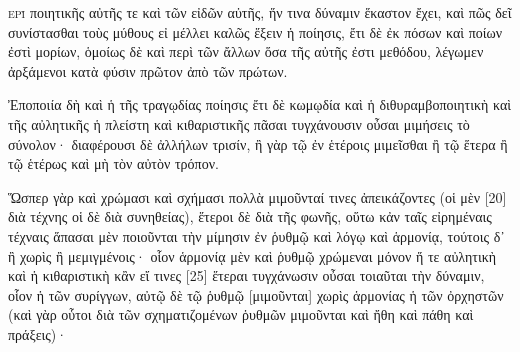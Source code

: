 \documentclass{book}
\begin{document}
{\newfontfamily{}
\plk
\newfontfamily{}
 \newsavebox{\mybox}
 \lettrine[lines=3]{\usebox{\mybox}}{ερὶ} ποιητικῆς αὐτῆς τε καὶ τῶν εἰδῶν αὐτῆς, ἥν τινα δύναμιν ἕκαστον ἔχει, 
καὶ πῶς δεῖ συνίστασθαι τοὺς μύθους  εἰ μέλλει καλῶς ἕξειν ἡ ποίησις, ἔτι δὲ ἐκ πόσων καὶ ποίων 
ἐστὶ μορίων, ὁμοίως δὲ καὶ περὶ τῶν ἄλλων ὅσα τῆς αὐτῆς ἐστι μεθόδου, λέγωμεν ἀρξάμενοι κατὰ φύσιν 
πρῶτον ἀπὸ τῶν πρώτων.
 
Ἐποποιία δὴ καὶ ἡ τῆς τραγῳδίας ποίησις ἔτι δὲ κωμῳδία καὶ ἡ διθυραμβοποιητικὴ καὶ τῆς αὐλητικῆς 
ἡ πλείστη καὶ κιθαριστικῆς πᾶσαι τυγχάνουσιν οὖσαι μιμήσεις τὸ σύνολον· διαφέρουσι δὲ ἀλλήλων τρισίν, 
ἢ γὰρ τῷ ἐν ἑτέροις μιμεῖσθαι ἢ τῷ ἕτερα ἢ τῷ ἑτέρως καὶ μὴ τὸν αὐτὸν τρόπον. 

Ὥσπερ γὰρ καὶ χρώμασι καὶ σχήμασι πολλὰ μιμοῦνταί τινες ἀπεικάζοντες (οἱ μὲν [20] διὰ τέχνης οἱ δὲ διὰ συνηθείας),
ἕτεροι δὲ διὰ τῆς φωνῆς, οὕτω κἀν ταῖς εἰρημέναις τέχναις ἅπασαι μὲν ποιοῦνται τὴν μίμησιν ἐν ῥυθμῷ καὶ λόγῳ καὶ
ἁρμονίᾳ, τούτοις δ᾽ ἢ χωρὶς ἢ μεμιγμένοις· οἷον ἁρμονίᾳ μὲν καὶ ῥυθμῷ χρώμεναι μόνον ἥ τε αὐλητικὴ καὶ ἡ κιθαριστικὴ
κἂν εἴ τινες [25] ἕτεραι τυγχάνωσιν οὖσαι τοιαῦται τὴν δύναμιν, οἷον ἡ τῶν συρίγγων, αὐτῷ δὲ τῷ ῥυθμῷ [μιμοῦνται]
χωρὶς ἁρμονίας ἡ τῶν ὀρχηστῶν (καὶ γὰρ οὗτοι διὰ τῶν σχηματιζομένων ῥυθμῶν μιμοῦνται καὶ ἤθη καὶ πάθη καὶ πράξεις)· 
 }
\end{document}
